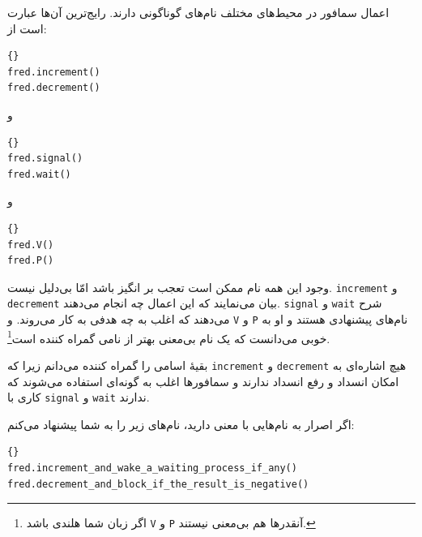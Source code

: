 \documentclass{book}
\begin{document}
    اعمال سمافور در محیط‌های مختلف نام‌های گوناگونی دارند. رایج‌ترین آن‌ها عبارت است از:
%
\begin{latin}
\begin{lstlisting}[title=\rl{اعمال سمافور}]{}
fred.increment()
fred.decrement()	
\end{lstlisting}
\end{latin}
%
و
%
\begin{latin}
\begin{lstlisting}[title=\rl{اعمال سمافور}]{}
fred.signal()
fred.wait()	
\end{lstlisting}
\end{latin}
%
و
%
\begin{latin}
\begin{lstlisting}[title=\rl{اعمال سمافور}]{}
fred.V()
fred.P()	
\end{lstlisting}
\end{latin}
%
    وجود این همه نام ممکن است تعجب بر انگیز باشد امّا بی‌دلیل نیست. 
    \texttt{increment} و \texttt{decrement}
    بیان می‌نمایند که این اعمال چه انجام می‌دهند. 
    \texttt{signal} و \texttt{wait}
    شرح می‌دهند که اغلب به چه هدفی به کار می‌روند. و
    \texttt{V} و \texttt{P}
    نام‌های پیشنهادی  هستند و او به خوبی می‌دانست که یک نام بی‌معنی بهتر از نامی گمراه کننده است\footnote{%
    اگر زبان شما هلندی باشد \texttt{V} و \texttt{P} آنقدرها هم بی‌معنی نیستند.}. 

    بقیه‌ٔ اسامی را گمراه کننده می‌دانم زیرا که  \texttt{increment} و \texttt{decrement}
    هیچ اشاره‌ای به امکان انسداد و رفع انسداد ندارند و سمافورها اغلب به گونه‌ای استفاده می‌شوند که کاری با \texttt{signal} و \texttt{wait}
    ندارند. 
    
    اگر اصرار به نام‌هایی با معنی دارید، نام‌های زیر را به شما پیشنهاد می‌کنم:
    

\begin{latin}
\begin{lstlisting}[title=\rl{اعمال سمافور}]{}
fred.increment_and_wake_a_waiting_process_if_any()
fred.decrement_and_block_if_the_result_is_negative()	
\end{lstlisting}
\end{latin}
\end{document}
